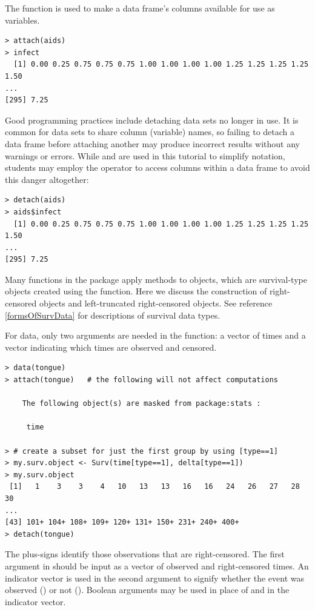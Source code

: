 \documentclass[11pt]{article}
\begin{document}
The  function is used to make a data frame's columns available for use as variables.
{\color{verbatimrcom}\begin{verbatim}
> attach(aids)
> infect
  [1] 0.00 0.25 0.75 0.75 0.75 1.00 1.00 1.00 1.00 1.25 1.25 1.25 1.25 1.50
...
[295] 7.25
\end{verbatim}}
Good programming practices include detaching data sets no longer in use. It is common for data sets to share column (variable) names, so failing to detach a data frame before attaching another may produce incorrect results without any warnings or errors. While  and  are used in this tutorial to simplify notation, students may employ the \rcom{\$} operator to access columns within a data frame to avoid this danger altogether:
{\color{verbatimrcom}\begin{verbatim}
> detach(aids)
> aids$infect
  [1] 0.00 0.25 0.75 0.75 0.75 1.00 1.00 1.00 1.00 1.25 1.25 1.25 1.25 1.50
...
[295] 7.25
\end{verbatim}}


\pagebreak

\vspace{-1mm}\par
{}
\label{survObjects}

Many functions in the  package apply methods to  objects, which are survival-type objects created using the  function. Here we discuss the construction of right-censored  objects and left-truncated right-censored  objects. See reference \ref{formsOfSurvData} for descriptions of survival data types.

For  data, only two arguments are needed in the  function: a vector of times and a vector indicating which times are observed and censored.
{\color{verbatimrcom}\begin{verbatim}
> data(tongue)
> attach(tongue)   # the following will not affect computations

	The following object(s) are masked from package:stats :

	 time 

> # create a subset for just the first group by using [type==1]
> my.surv.object <- Surv(time[type==1], delta[type==1])
> my.surv.object
 [1]   1    3    3    4   10   13   13   16   16   24   26   27   28   30 
...
[43] 101+ 104+ 108+ 109+ 120+ 131+ 150+ 231+ 240+ 400+
> detach(tongue)
\end{verbatim}}
The plus-signs identify those observations that are right-censored. The first argument in  should be input as a vector of observed and right-censored times. An indicator vector is used in the second argument to signify whether the event was observed () or not (). Boolean arguments may be used in place of  and  in the indicator vector.
\end{document}
